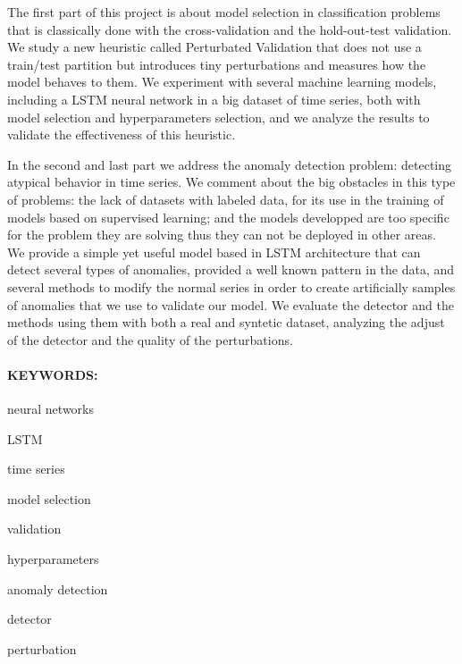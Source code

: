 The first part of this project is about model selection in classification problems that is classically done with the cross-validation and the hold-out-test validation. We study a new heuristic called Perturbated Validation that does not use a train/test partition but introduces tiny perturbations and measures how the model behaves to them. We experiment with several machine learning models, including a LSTM neural network in a big dataset of time series, both with model selection and hyperparameters selection, and we analyze the results to validate the effectiveness of this heuristic.

In the second and last part we address the anomaly detection problem: detecting atypical behavior in time series.
We comment about the big obstacles in this type of problems: the lack of datasets with labeled data, for its use in the training of models based on supervised learning; and the models developped are too specific for the problem they are solving thus they can not be deployed in other areas. We provide a simple yet useful model based in LSTM architecture that can detect several types of anomalies, provided a well known pattern in the data, and several methods to modify the normal series in order to create artificially samples of anomalies that we use to validate our model. We evaluate the detector and the methods using them with both a real and syntetic dataset, analyzing the adjust of the detector and the quality of the perturbations.

\paragraph{KEYWORDS:}
\begin{itemize*}[label=,itemsep=1em,itemjoin=\hspace{1em}]
  \item neural networks
  \item LSTM
  \item time series
  \item model selection
  \item validation
  \item hyperparameters
  \item anomaly detection
  \item detector
  \item perturbation
\end{itemize*}

\endinput
